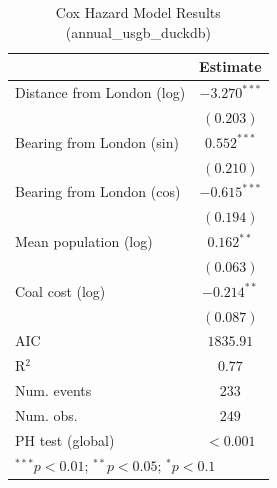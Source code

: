 
\begin{table}
\begin{center}
\begin{tabular}{l c}
\hline
 & Estimate \\
\hline
Distance from London (log) & $-3.270^{***}$ \\
 & $(0.203)$ \\
Bearing from London (sin) & $0.552^{***}$ \\
 & $(0.210)$ \\
Bearing from London (cos) & $-0.615^{***}$ \\
 & $(0.194)$ \\
Mean population (log) & $0.162^{**}$ \\
 & $(0.063)$ \\
Coal cost (log) & $-0.214^{**}$ \\
 & $(0.087)$ \\
\hline
AIC              & $1835.91$ \\
R$^2$            & $0.77$ \\
Num. events      & $233$ \\
Num. obs.        & $249$ \\
PH test (global) & $<0.001$ \\
\hline
\multicolumn{2}{l}{\scriptsize{$^{***}p<0.01$; $^{**}p<0.05$; $^{*}p<0.1$}}
\end{tabular}
\caption{Cox Hazard Model Results (annual\_usgb\_duckdb)}
\label{tab:cox_annual_usgb_duckdb}
\end{center}
\end{table}
